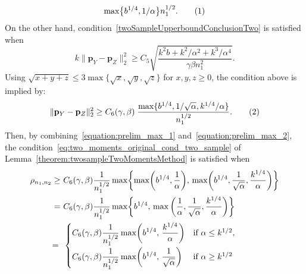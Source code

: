 \documentclass[twoside,11pt]{article}
\newcommand\numberthis{\addtocounter{equation}{1}\tag{\theequation}}
\newcommand{\rvTwo}{Y}
\newcommand{\rvThree}{Z}
\newcommand{\alphabetSize}{k} %
\newcommand{\sampleSize}{n}
\newcommand{\probVec}{\mathbf{p}} %
\newcommand{\privacyParameter}{\alpha} %
\begin{document}
\begin{appendix}
\begin{align*}
{			\max \bigl\{ {b}^{1/4},  1/\privacyParameter \bigr\}
		}{
			\sampleSize_1^{1/2}}.
		\numberthis\label{equation:prelim_max_1}
	\end{align*}
	On the other hand,
	condition~\eqref{twoSampleUpperboundConclusionTwo} is satisfied when 
	$$
	\alphabetSize \| \probVec_\rvTwo - \probVec_\rvThree \|_2^2
	\geq
	C_5 \sqrt{
		\frac{{\alphabetSize}^2
			{b} + 
			\alphabetSize^2 / \privacyParameter^2 +
			\alphabetSize^3 / \privacyParameter^4
		}{\gamma \beta \sampleSize_1^2}}.
	$$ 
	Using $\sqrt{x+y+z} \leq 3 \max\{ \sqrt{x},  \sqrt{y}, \sqrt{z}\}$ for $x, y, z \geq 0$, the condition above is implied by:
	\begin{align*}
		\| \probVec_\rvTwo - \probVec_\rvThree \|_2^2 
		\geq 
		C_6(\gamma, \beta) \;
		\frac{
			\max \{{b}^{1/4}, 1/\sqrt{\privacyParameter}, \alphabetSize^{1/4} / \privacyParameter \}
		}{ \sampleSize_1^{1/2}}.
		\numberthis\label{equation:prelim_max_2}
	\end{align*}
	Then, by combining~\eqref{equation:prelim_max_1} and~\eqref{equation:prelim_max_2}, the condition~\eqref{eq:two_moments_original_cond_two_sample} of Lemma~\ref{theorem:twosampleTwoMomentsMethod} is satisfied when
	\begin{align*}
		\rho_{\sampleSize_1,\sampleSize_2}
		\geq ~&
		C_6(\gamma, \beta)
		\frac{1}{\sampleSize_1^{1/2}}
		\max
		\biggl\{
		\max
		\biggl(
		{b}^{1/4}, \frac{1}{\privacyParameter}
		\biggr), \,
		\max
		\biggl(
		{b}^{1/4},
		\frac{1}{\sqrt{\privacyParameter}},
		\frac{\alphabetSize^{1/4}}{\privacyParameter}
		\biggr)
		\biggr\}
		\\= ~ &
		C_6(\gamma, \beta) 
		\frac{1}{\sampleSize_1^{1/2}}
		\max
		\biggl\{
		{b}^{1/4}, \,
		\max
		\bigg(
		\frac{1}{\privacyParameter},
		\frac{1}{\sqrt{\privacyParameter}},
		\frac{\alphabetSize^{1/4}}{\privacyParameter}
		\biggr)
		\biggr\}
		\\= \hskip 1.91mm &
		\begin{cases}
			\displaystyle C_6(\gamma, \beta) 
			\frac{1}{\sampleSize_1^{1/2}}
			\max
			\biggl(
			{b}^{1/4}, \,
			\frac{\alphabetSize^{1/4}}{\privacyParameter}
			\biggr) & \text{if}~\alpha \leq \alphabetSize^{1/2},
			\\[1em]
			\displaystyle C_6(\gamma, \beta)
			\frac{1}{\sampleSize_1^{1/2}}
			\max
			\biggl(
			{b}^{1/4}, \,
			\frac{1}{\sqrt{\privacyParameter}}
			\biggr) & \text{if}~\alpha \geq \alphabetSize^{1/2}

\end{cases}
\end{align*}
\end{appendix}
\end{document}
